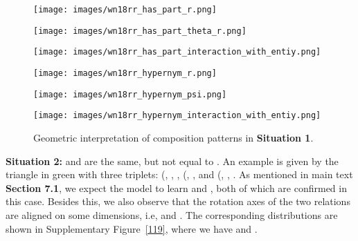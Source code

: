 \documentclass[11pt]{article}
\begin{document}
\begin{figure*}[htbp]
\centering
\begin{minipage}{3.8cm}
\centering
\texttt{[image: images/wn18rr\_has\_part\_r.png]}
\subcaption{\tiny{}}
\end{minipage}
\begin{minipage}{3.8cm}
\centering
\texttt{[image: images/wn18rr\_has\_part\_theta\_r.png]}
\subcaption{\tiny{}}
\end{minipage}
\begin{minipage}{3.8cm}
\centering
\texttt{[image: images/wn18rr\_has\_part\_interaction\_with\_entiy.png]}
\end{minipage}
\begin{minipage}{3.8cm}
\centering
\texttt{[image: images/wn18rr\_hypernym\_r.png]}
\subcaption{\tiny{}}
\end{minipage}
\begin{minipage}{3.8cm}
\centering
\texttt{[image: images/wn18rr\_hypernym\_psi.png]}
\subcaption{\tiny{}}
\end{minipage}
\begin{minipage}{3.8cm}
\centering
\texttt{[image: images/wn18rr\_hypernym\_interaction\_with\_entiy.png]}
\end{minipage}
\caption{Geometric interpretation of composition patterns in \textbf{Situation 1}.}
\label{has part}
\end{figure*}




\textbf{Situation 2:}  and  are the same, but not equal to . An example is given by the triangle in green with three triplets: (, , , (, ,  and (, , . As mentioned in main text \textbf{Section 7.1}, we expect the model to learn  and , both of which are confirmed in this case. Besides this, we also observe that the rotation axes of the two relations are aligned on some dimensions, i.e,  and . The corresponding distributions are shown in Supplementary Figure~\ref{119}, where we have  and . 
\end{document}
